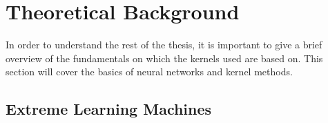 




\section{Theoretical Background}%
\label{sec:theoretical_background}

In order to understand the rest of the thesis, it is important to give a brief
overview of the fundamentals on which the kernels used are based on. This
section will cover the basics of neural networks and kernel methods.

\subsection{Extreme Learning Machines}%
\label{sub:neural_networks_fundamentals}

